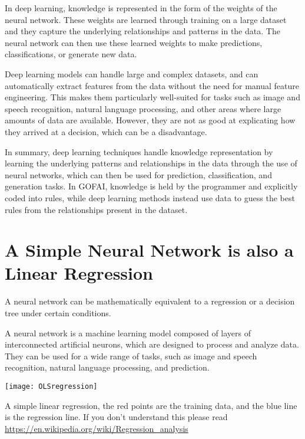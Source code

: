 In deep learning, knowledge is represented in the form of the weights of the neural network. These weights are learned through training on a large dataset and they capture the underlying relationships and patterns in the data. The neural network can then use these learned weights to make predictions, classifications, or generate new data.

Deep learning models can handle large and complex datasets, and can automatically extract features from the data without the need for manual feature engineering. This makes them particularly well-suited for tasks such as image and speech recognition, natural language processing, and other areas where large amounts of data are available. However, they are not as good at explicating how they arrived at a decision, which can be a disadvantage.

In summary, deep learning techniques handle knowledge representation by learning the underlying patterns and relationships in the data through the use of neural networks, which can then be used for prediction, classification, and generation tasks. In GOFAI, knowledge is held by the programmer and explicitly coded into rules, while deep learning methods instead use data to guess the best rules from the relationships present in the dataset.

\section{A Simple Neural Network is also a Linear Regression}

A neural network can be mathematically equivalent to a regression or a decision tree under certain conditions.

A neural network is a machine learning model composed of layers of interconnected artificial neurons, which are designed to process and analyze data. They can be used for a wide range of tasks, such as image and speech recognition, natural language processing, and prediction.

\begin{pdf}
\begin{marginfigure}[-5.5cm]
	\texttt{[image: OLSregression]}
        \caption{A simple linear regression, the red points are the training data, and the blue line is the regression line. If you don't understand this please read \url{https://en.wikipedia.org/wiki/Regression_analysis}}
\end{marginfigure}
\end{pdf}

